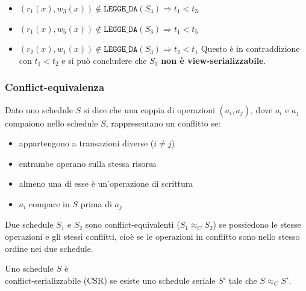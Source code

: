 \documentclass[a4paper]{article}
\begin{document}
\begin{exercise}
\begin{itemize}
\begin{itemize}
         \item \( (r_1(x), w_3(x)) \notin \texttt{LEGGE\_DA}(S_3) \Rightarrow
           t_1 < t_3 \)

         \item \( (r_1(x), w_5(x)) \notin \texttt{LEGGE\_DA}(S_3) \Rightarrow
           t_1 < t_5 \)

         \item \( (r_2(x), w_1(x)) \notin \texttt{LEGGE\_DA}(S_3) \Rightarrow
           t_2 < t_1 \) Questo è in contraddizione con \( t_1 < t_2 \)
           e si può concludere che \( S_3 \) \textbf{non è view-serializzabile}.
       \end{itemize}
  \end{itemize}
\end{exercise}

\subsubsection{Conflict-equivalenza}

\begin{definition}[Conflitto]
  Dato uno schedule \( S \) si dice che una coppia di operazioni \( (a_i, a_j) \),
  dove \( a_i \) e \( a_j \) compaiono nello schedule \( S \), rappresentano un
  conflitto se:
  \begin{itemize}
    \item appartengono a transazioni diverse (\( i \neq j \))

    \item entrambe operano sulla stessa risorsa

    \item almeno una di esse è un'operazione di scrittura

    \item \( a_i \) compare in \( S \) prima di \( a_j \)
  \end{itemize}
\end{definition}

\begin{definition}
  Due schedule \( S_1 \) e \( S_2 \) sono conflict-equivalenti (\( S_1 \approx_C S_2 \))
  se possiedono le stesse operazioni e gli stessi conflitti, cioè se le operazioni 
  in conflitto sono nello stesso ordine nei due schedule.
\end{definition}

\begin{definition}
  Uno schedule \( S \) è \\ conflict-serializzabile (CSR) se esiste uno schedule seriale
  \( S' \) tale che \( S \approx_C S' \).
\end{definition}
\end{document}
